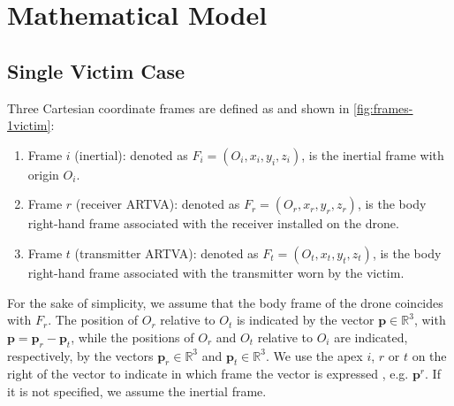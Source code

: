 \chapter{Mathematical Model}

\section{Single Victim Case}
Three Cartesian coordinate frames are defined as \cite{main} and shown in \ref{fig:frames-1victim}:
\begin{enumerate}[label=(\roman*)]
    \item Frame $i$ (inertial): denoted as $F_i = (O_i, x_i, y_i, z_i)$, is the inertial frame with origin $O_i$.
    \item Frame $r$ (receiver ARTVA): denoted as $F_r = (O_r, x_r, y_r, z_r)$, is the body right-hand frame associated with the receiver installed on the drone.
    \item Frame $t$ (transmitter ARTVA): denoted as $F_t = (O_t, x_t, y_t, z_t)$, is the body right-hand frame associated with the transmitter worn by the victim.
\end{enumerate}
For the sake of simplicity, we assume that the body frame of the drone coincides with $F_r$. 
The position of $O_r$ relative to $O_t$ is indicated by the vector $\mathbf{p} \in \mathbb{R}^3$, with $\mathbf{p} = \mathbf{p}_r - \mathbf{p}_t$, 
while the positions of $O_r$ and $O_t$ relative to $O_i$ are indicated, respectively, by the vectors $\mathbf{p}_r \in \mathbb{R}^3$ and $\mathbf{p}_t \in \mathbb{R}^3$.
We use the apex $i$, $r$ or $t$ on the right of the vector to indicate in which frame the vector is expressed , e.g. $\mathbf{p}^r$. 
If it is not specified, we assume the inertial frame.
